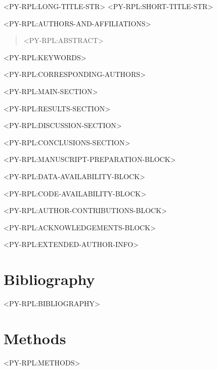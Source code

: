 \documentclass[times, twoside]{rxiv_maker_style}
\begin{document}
<PY-RPL:LONG-TITLE-STR>
<PY-RPL:SHORT-TITLE-STR>

<PY-RPL:AUTHORS-AND-AFFILIATIONS>

\maketitle

\begin{abstract}

<PY-RPL:ABSTRACT>

\end{abstract}

<PY-RPL:KEYWORDS>

<PY-RPL:CORRESPONDING-AUTHORS>

<PY-RPL:MAIN-SECTION>

<PY-RPL:RESULTS-SECTION>

<PY-RPL:DISCUSSION-SECTION>

<PY-RPL:CONCLUSIONS-SECTION>

\vspace{1em}

<PY-RPL:MANUSCRIPT-PREPARATION-BLOCK>

<PY-RPL:DATA-AVAILABILITY-BLOCK>

<PY-RPL:CODE-AVAILABILITY-BLOCK>

<PY-RPL:AUTHOR-CONTRIBUTIONS-BLOCK>

<PY-RPL:ACKNOWLEDGEMENTS-BLOCK>

\begin{exauthor}
<PY-RPL:EXTENDED-AUTHOR-INFO>
\end{exauthor}

\section*{Bibliography}
<PY-RPL:BIBLIOGRAPHY>

\section*{Methods}
<PY-RPL:METHODS>

\onecolumn
\newpage



\end{document}
